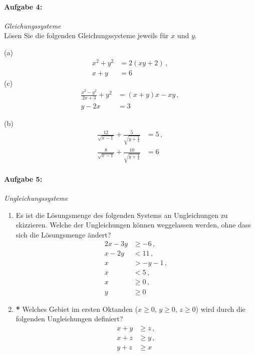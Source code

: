 \paragraph{Aufgabe 4: } \emph{Gleichungssysteme}\\[0.2cm]
Lösen Sie die folgenden Gleichungssysteme jeweils für $x$ und $y$.\\[0.5cm]
\begin{minipage}[t]{0.45\linewidth}
(a)\vspace{-2.7em}
\begin{align*}
    x^2+y^2&=2(xy+2)\,,\\ x+y&=6
\end{align*}
(c)\vspace{-2,7em}
\begin{align*}
    \frac{x^2-y^2}{2x+3}+y^2&=(x+y)x-xy\,,\\
    y-2x&=3
\end{align*}
\end{minipage}\hfill
\begin{minipage}[t]{0.4\linewidth}
(b)\vspace{-2.7em}
\begin{align*}
    \frac{12}{\sqrt{x-1}}+\frac{5}{\sqrt{y+\frac{1}{4}}}&=5\,,\\ \frac{8}{\sqrt{x-1}}+\frac{10}{\sqrt{y+\frac{1}{4}}}&=6
\end{align*}
\end{minipage}
%
\paragraph{Aufgabe 5: } \emph{Ungleichungssysteme}
\begin{enumerate}[label=(\alph*), labelindent=1em,labelsep=0.5cm]
\item Es ist die Lösungsmenge des folgenden Systems an Ungleichungen zu skizzieren. Welche der Ungleichungen können weggelassen werden, ohne dass sich die Lösungsmenge ändert?
\begin{align*}
    2x-3y&\geq -6\,,\\
    x-2y&< 11\,,\\
    x&>-y-1\,,\\
    x&<5\,,\\
    x&\geq 0\,,\\
    y&\geq 0
\end{align*}
\item \textbf{*} Welches Gebiet im ersten Oktanden ($x\ge 0$, $y\ge 0$, $z\ge 0$) wird durch die folgenden Ungleichungen definiert?
\begin{align*}
    x+y&\ge z\,,\\
    x+z&\ge y\,,\\
    y+z&\ge x
\end{align*}
\end{enumerate}